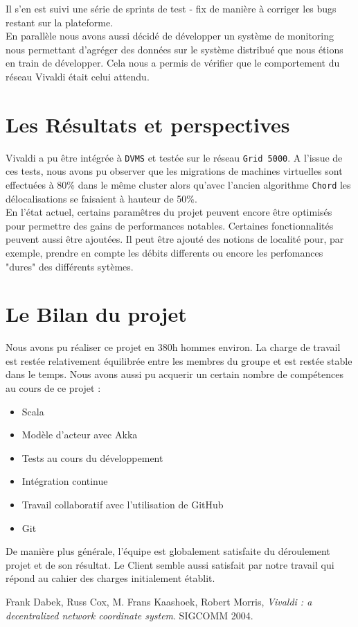 \documentclass[11pt,a4paper]{article}
\begin{document}
Il s'en est suivi une série de sprints de test - fix de manière à corriger les bugs restant sur la plateforme.\\

En parallèle nous avons aussi décidé de développer un système de monitoring nous permettant d'agréger des données sur le système distribué que nous étions en train de développer. Cela nous a permis de vérifier que le comportement du réseau Vivaldi était celui attendu.

\section{Les Résultats et perspectives}
Vivaldi a pu être intégrée à \texttt{DVMS} et testée sur le réseau \texttt{Grid 5000}. A l'issue de ces tests, nous avons pu observer que les migrations de machines virtuelles sont effectuées à 80\% dans le même cluster alors qu'avec l'ancien algorithme \texttt{Chord} les délocalisations se faisaient à hauteur de 50\%.\\

En l'état actuel, certains paramêtres du projet peuvent encore être optimisés pour permettre des gains de performances notables. Certaines fonctionnalités peuvent aussi être ajoutées. Il peut être ajouté des notions de localité pour, par exemple, prendre en compte les débits differents ou encore les perfomances "dures" des différents sytèmes.

\section{Le Bilan du projet}
Nous avons pu réaliser ce projet en 380h hommes environ. La charge de travail est restée relativement équilibrée entre les membres du groupe et est restée stable dans le temps. Nous avons aussi pu acquerir un certain nombre de compétences au cours de ce projet :
\begin{itemize}
\item Scala
\item Modèle d'acteur avec Akka
\item Tests au cours du développement
\item Intégration continue
\item Travail collaboratif avec l'utilisation de GitHub
\item Git \\
\end{itemize}

De manière plus générale, l'équipe est globalement satisfaite du déroulement projet et de son résultat. Le Client semble aussi satisfait par notre travail qui répond au cahier des charges initialement établit. 

\begin{thebibliography}{9}

  Frank Dabek, Russ Cox, M. Frans Kaashoek, Robert Morris,
  \emph{Vivaldi : a decentralized network coordinate system}.
  SIGCOMM 2004.

\end{thebibliography}
\end{document}
